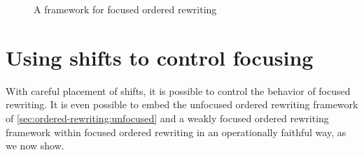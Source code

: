 \begin{figure}[tbp]
  \caption{A framework for focused ordered rewriting}
\end{figure}

\section{Using shifts to control focusing}\label{sec:ordered-rewriting:shifts}

With careful placement of shifts, it is possible to control the behavior of focused rewriting.
It is even possible to embed the unfocused ordered rewriting framework of \cref{sec:ordered-rewriting:unfocused} and a weakly focused ordered rewriting framework within focused ordered rewriting in an operationally faithful way, as we now show.



